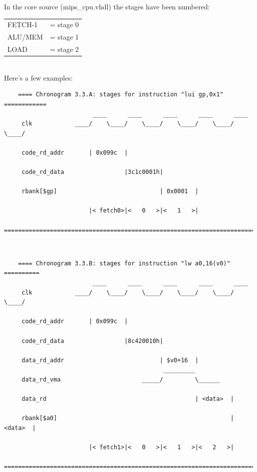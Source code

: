     In the core source (mips\_cpu.vhdl) the stages have been numbered:\\
    
    \begin{tabular}{ l l }
        FETCH-1 & = stage 0\\
        ALU/MEM & = stage 1\\
        LOAD    & = stage 2
    \end{tabular}\\  
    
    Here's a few examples:\\

\begin{verbatim}
    ==== Chronogram 3.3.A: stages for instruction "lui gp,0x1" ============
                         ____      ____      ____      ____      ____
     clk            ____/    \____/    \____/    \____/    \____/    \____/

     code_rd_addr       | 0x099c  |                                        
     
     code_rd_data                 |3c1c0001h|

     rbank[$gp]                             | 0x0001  |
     
                        |< fetch0>|<   0   >|<   1   >|
    =======================================================================
\end{verbatim}\\


\begin{verbatim}
    ==== Chronogram 3.3.B: stages for instruction "lw a0,16(v0)" ==========
                         ____      ____      ____      ____      ____
     clk            ____/    \____/    \____/    \____/    \____/    \____/

     code_rd_addr       | 0x099c  |                                        
     
     code_rd_data                 |8c420010h|
     
     data_rd_addr                           | $v0+16  |
                                             _________
     data_rd_vma                       _____/         \______
     
     data_rd                                          | <data>  |

     rbank[$a0]                                                 | <data>  |
     
                        |< fetch1>|<   0   >|<   1   >|<   2   >|
    ========================================================================
\end{verbatim}\\


